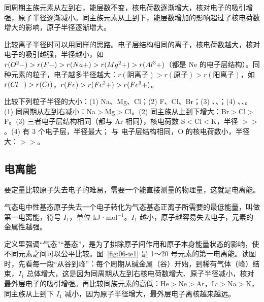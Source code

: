 同周期主族元素从左到右，能层数不变，核电荷数逐渐增大，核对电子的吸引增强，原子半径逐渐减小。同主族元素从上到下，能层数增加的影响超过了核电荷数增大的影响，原子半径逐渐增大。

比较离子半径时可以用同样的思路。电子层结构相同的离子，核电荷数越大，核对电子的吸引越强，半径越小，如 $r(O^2-)>r(F-)>r(Na+)>r(Mg^2+)>r(Al^3+)$（都是 Ne 的电子层结构）。同种元素的粒子，电子越多半径越大：$r(\text{阴离子})>r(\text{原子})>r(\text{阳离子})$，如 $r(Cl-)>r(Cl)$，$r(Fe)>r(Fe^2+)>r(Fe^3+)$。

\begin{liti}[基础]
比较下列粒子半径的大小：(1) Na、Mg、Cl；(2) F、Cl、Br；(3) 、、；(4) 、、。
\tcblower
\jie (1) 同周期从左到右减小：Na$>$Mg$>$Cl。(2) 同主族从上到下增大：Br$>$Cl$>$F。(3) 三者电子层结构相同（都与 Ar 相同），核电荷数 S$<$Cl$<$K，半径 $>$$>$。(4)  有 3 个电子层，半径最大； 与  电子层结构相同，O 的核电荷数小，半径大：$>$$>$。
\end{liti}

\subsection{电离能}
要定量比较原子失去电子的难易，需要一个能直接测量的物理量，这就是电离能。

\begin{gainian}[第一电离能]
气态电中性基态原子失去一个电子转化为气态基态正离子所需要的最低能量，叫做第一电离能，符号 $I_1$，单位 kJ·mol$^{-1}$。$I_1$ 越小，原子越容易失去电子，元素的金属性越强。
\end{gainian}

定义里强调“气态”“基态”，是为了排除原子间作用和原子本身能量状态的影响，使不同元素之间可以公平比较。图~\ref{fig:06-ie1} 是 1～20 号元素的第一电离能。读图时，先看每一段“从谷到峰”：每个周期从碱金属（谷）开始，到稀有气体（峰）结束，$I_1$ 总体增大，这是因为同周期从左到右核电荷数增大、原子半径减小，核对最外层电子的吸引增强。再比较同族元素的高低：He$>$Ne$>$Ar，Li$>$Na$>$K，同主族从上到下 $I_1$ 减小，因为原子半径增大，最外层电子离核越来越远。

